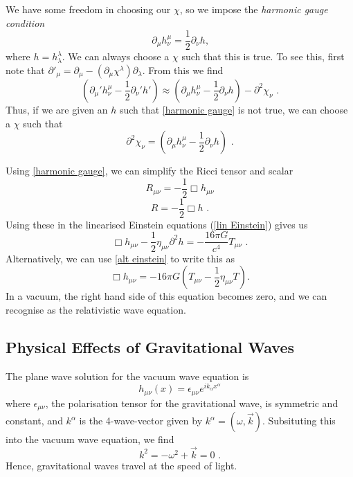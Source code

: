\documentclass[12pt,twoside,a4paper]{report}
\newcommand{\mn}{_{\mu\nu}}
\newcommand{\fs}{\text{ .}}
\begin{document}
We have some freedom in choosing our $\chi$, so we impose the \textit{harmonic gauge condition}
\begin{equation} \label{harmonic gauge}
\partial_\mu h^\mu_\nu = \frac{1}{2} \partial_\nu h \text{,}
\end{equation}
where $h=h^\lambda_\lambda$. We can always choose a $\chi$ such that this is true. To see this, first note that $\partial'_\mu = \partial_\mu - (\partial_\mu \chi^\lambda) \partial_\lambda$. From this we find
\begin{equation}
(\partial_\mu' h_\nu^\mu - \frac{1}{2}\partial_\nu' h') \approx (\partial_\mu h^\mu_\nu - \frac{1}{2} \partial_\nu h ) -\partial^2 \chi_\nu \fs
\end{equation}
Thus, if we are given an $h$ such that \ref{harmonic gauge} is not true, we can choose a $\chi$ such that 
\begin{equation} \label{harmonic chi}
\partial^2 \chi_\nu = (\partial_\mu h^\mu_\nu - \frac{1}{2}\partial_\nu h) \fs
\end{equation}

Using \ref{harmonic gauge}, we can simplify the Ricci tensor and scalar
\begin{equation}
R\mn = -\frac{1}{2}\Box h\mn
\end{equation}
\begin{equation}
R=-\frac{1}{2}\Box h \fs
\end{equation}
Using these in the linearised Einstein equations (\ref{lin Einstein}) gives us
\begin{equation}
\Box h\mn - \frac{1}{2}\eta\mn\partial^2 h =-\frac{16\pi G}{c^4}T\mn \fs
\end{equation}
Alternatively, we can use \ref{alt einstein} to write this as
\begin{equation}
\Box h\mn = -16\pi G \left( T\mn -\frac{1}{2} \eta\mn T \right). 
\end{equation}
In a vacuum, the right hand side of this equation becomes zero, and we can recognise as the relativistic wave equation. 

\subsection{Physical Effects of Gravitational Waves}
The plane wave solution for the vacuum wave equation is
\begin{equation} \label{plane wave}
h\mn (x) = \epsilon\mn e^{ik_\alpha x^\alpha} 
\end{equation}
where $\epsilon\mn$, the polarisation tensor for the gravitational wave, is symmetric and constant, and $k^\alpha$ is the 4-wave-vector given by $k^\alpha = (\omega,\vec{k})$. Subsituting this into the vacuum wave equation, we find 
\begin{equation}
k^2 = -\omega^2 + \vec{k} =0 \fs
\end{equation}
Hence, gravitational waves travel at the speed of light. 
\end{document}
